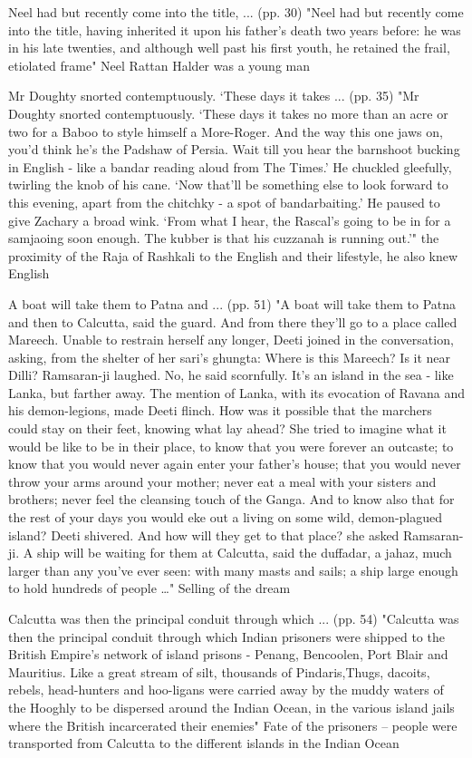 Neel had but recently come into the title, ... (pp. 30)
"Neel had but recently come into the title, having inherited it upon his father’s death two years before: he was in his late twenties, and although well past his first youth, he retained the frail, etiolated frame"
Neel Rattan Halder was a young man

Mr Doughty snorted contemptuously. ‘These days it takes ... (pp. 35)
"Mr Doughty snorted contemptuously. ‘These days it takes no more than an acre or two for a Baboo to style himself a More-Roger. And the way this one jaws on, you’d think he’s the Padshaw of Persia. Wait till you hear the barnshoot bucking in English - like a bandar reading aloud from The Times.’ He chuckled gleefully, twirling the knob of his cane. ‘Now that’ll be something else to look forward to this evening, apart from the chitchky - a spot of bandarbaiting.’ He paused to give Zachary a broad wink. ‘From what I hear, the Rascal’s going to be in for a samjaoing soon enough. The kubber is that his cuzzanah is running out.’"
the proximity of the Raja of Rashkali to the English and their lifestyle, he also knew English

A boat will take them to Patna and ... (pp. 51)
"A boat will take them to Patna and then to Calcutta, said the guard. And from there they’ll go to a place called Mareech. Unable to restrain herself any longer, Deeti joined in the conversation, asking, from the shelter of her sari’s ghungta: Where is this Mareech? Is it near Dilli? Ramsaran-ji laughed. No, he said scornfully. It’s an island in the sea - like Lanka, but farther away. The mention of Lanka, with its evocation of Ravana and his demon-legions, made Deeti flinch. How was it possible that the marchers could stay on their feet, knowing what lay ahead? She tried to imagine what it would be like to be in their place, to know that you were forever an outcaste; to know that you would never again enter your father’s house; that you would never throw your arms around your mother; never eat a meal with your sisters and brothers; never feel the cleansing touch of the Ganga. And to know also that for the rest of your days you would eke out a living on some wild, demon-plagued island? Deeti shivered. And how will they get to that place? she asked Ramsaran-ji. A ship will be waiting for them at Calcutta, said the duffadar, a jahaz, much larger than any you’ve ever seen: with many masts and sails; a ship large enough to hold hundreds of people …"
Selling of the dream

Calcutta was then the principal conduit through which ... (pp. 54)
"Calcutta was then the principal conduit through which Indian prisoners were shipped to the British Empire’s network of island prisons - Penang, Bencoolen, Port Blair and Mauritius. Like a great stream of silt, thousands of Pindaris,Thugs, dacoits, rebels, head-hunters and hoo-ligans were carried away by the muddy waters of the Hooghly to be dispersed around the Indian Ocean, in the various island jails where the British incarcerated their enemies"
Fate of the prisoners -- people were transported from Calcutta to the different islands in the Indian Ocean

